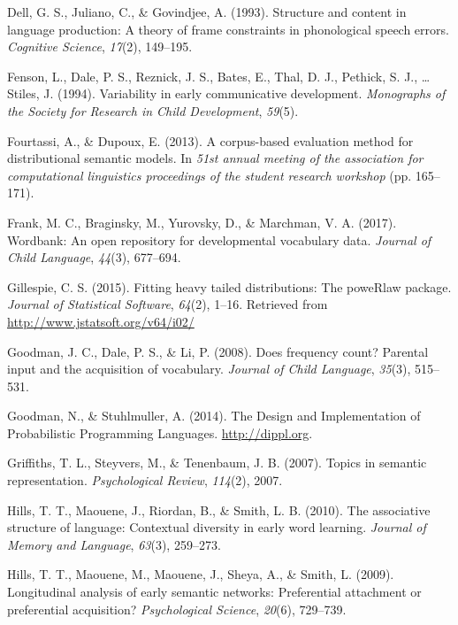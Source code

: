 \documentclass[english,floatsintext,man]{apa6}
\theoremstyle{definition}
\theoremstyle{definition}
\theoremstyle{definition}
\theoremstyle{remark}
\begin{document}
\hypertarget{ref-dell1993}{}
Dell, G. S., Juliano, C., \& Govindjee, A. (1993). Structure and content
in language production: A theory of frame constraints in phonological
speech errors. \emph{Cognitive Science}, \emph{17}(2), 149--195.

\hypertarget{ref-fenson94}{}
Fenson, L., Dale, P. S., Reznick, J. S., Bates, E., Thal, D. J.,
Pethick, S. J., \ldots{} Stiles, J. (1994). Variability in early
communicative development. \emph{Monographs of the Society for Research
in Child Development}, \emph{59}(5).

\hypertarget{ref-fourtassi2013}{}
Fourtassi, A., \& Dupoux, E. (2013). A corpus-based evaluation method
for distributional semantic models. In \emph{51st annual meeting of the
association for computational linguistics proceedings of the student
research workshop} (pp. 165--171).

\hypertarget{ref-frank2017}{}
Frank, M. C., Braginsky, M., Yurovsky, D., \& Marchman, V. A. (2017).
Wordbank: An open repository for developmental vocabulary data.
\emph{Journal of Child Language}, \emph{44}(3), 677--694.

\hypertarget{ref-gillespie15}{}
Gillespie, C. S. (2015). Fitting heavy tailed distributions: The
poweRlaw package. \emph{Journal of Statistical Software}, \emph{64}(2),
1--16. Retrieved from \url{http://www.jstatsoft.org/v64/i02/}

\hypertarget{ref-goodman2008}{}
Goodman, J. C., Dale, P. S., \& Li, P. (2008). Does frequency count?
Parental input and the acquisition of vocabulary. \emph{Journal of Child
Language}, \emph{35}(3), 515--531.

\hypertarget{ref-dippl}{}
Goodman, N., \& Stuhlmuller, A. (2014). The Design and Implementation of
Probabilistic Programming Languages. \url{http://dippl.org}.

\hypertarget{ref-griffiths07}{}
Griffiths, T. L., Steyvers, M., \& Tenenbaum, J. B. (2007). Topics in
semantic representation. \emph{Psychological Review}, \emph{114}(2),
2007.

\hypertarget{ref-hills2010}{}
Hills, T. T., Maouene, J., Riordan, B., \& Smith, L. B. (2010). The
associative structure of language: Contextual diversity in early word
learning. \emph{Journal of Memory and Language}, \emph{63}(3), 259--273.

\hypertarget{ref-hills2009}{}
Hills, T. T., Maouene, M., Maouene, J., Sheya, A., \& Smith, L. (2009).
Longitudinal analysis of early semantic networks: Preferential
attachment or preferential acquisition? \emph{Psychological Science},
\emph{20}(6), 729--739.
\end{document}
